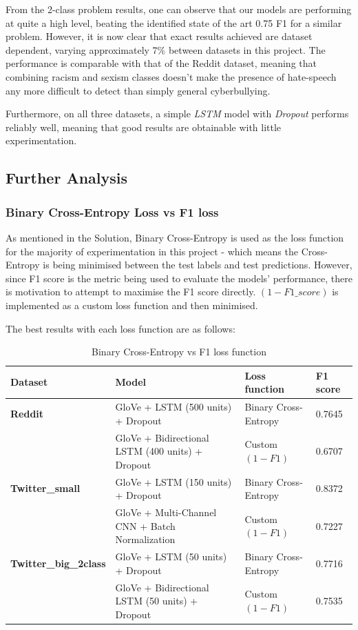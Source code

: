 \documentclass[12pt,a4paper]{article}
\begin{document}
From the 2-class problem results, one can observe that our models are performing at quite a high level, beating the identified state of the art 0.75 F1 \cite{Hack} for a similar problem. However, it is now clear that exact results achieved are dataset dependent, varying approximately 7\% between datasets in this project. The performance is comparable with that of the Reddit dataset, meaning that combining racism and sexism classes doesn't make the presence of hate-speech any more difficult to detect than simply general cyberbullying.

Furthermore, on all three datasets, a simple \textit{LSTM} model with \textit{Dropout} performs reliably well, meaning that good results are obtainable with little experimentation.

\subsection{Further Analysis}
\subsubsection{Binary Cross-Entropy Loss vs F1 loss}
As mentioned in the Solution, Binary Cross-Entropy is used as the loss function for the majority of experimentation in this project - which means the Cross-Entropy is being minimised between the test labels and test predictions. However, since F1 score is the metric being used to evaluate the models' performance, there is motivation to attempt to maximise the F1 score directly. $(1-F1\_score)$ is implemented as a custom loss function and then minimised. 

The best results with each loss function are as follows:

\begin{table}[H]
	\centering
	\vspace*{-10pt}
	\caption{Binary Cross-Entropy vs F1 loss function}
	\label{F1Loss}
	\hspace*{-2.0cm}
	\begin{tabular}{p{3.2cm} p{9cm} p{3.9cm} p{1.7cm}} \hline\hline
		\textbf{Dataset} & \textbf{Model} & \textbf{Loss function} & \textbf{F1 score}  \\ \hline
		
		\textbf{Reddit} & GloVe + LSTM (500 units) + Dropout & Binary Cross-Entropy & 0.7645  \\
		& GloVe + Bidirectional LSTM (400 units) + Dropout & Custom $(1-F1)$ & 0.6707  \\ \hline
		
		\textbf{Twitter\_small} & GloVe + LSTM (150 units) + Dropout & Binary Cross-Entropy & 0.8372 \\
		& GloVe + Multi-Channel CNN + Batch Normalization & Custom $(1-F1)$ & 0.7227 \\ \hline
		
		\textbf{Twitter\_big\_2class} & GloVe + LSTM (50 units) + Dropout & Binary Cross-Entropy & 0.7716 \\
		& GloVe + Bidirectional LSTM (50 units) + Dropout & Custom $(1-F1)$ & 0.7535 \\ \hline
	\end{tabular}
\end{table}
\end{document}

